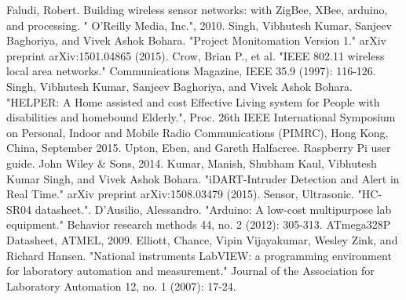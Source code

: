 \documentclass[letterpaper, 10 pt, conference]{ieeeconf}
\begin{document}
\begin{thebibliography}{99}

 Faludi, Robert. Building wireless sensor networks: with ZigBee, XBee, arduino, and processing. " O'Reilly Media, Inc.", 2010.
 Singh, Vibhutesh Kumar, Sanjeev Baghoriya, and Vivek Ashok Bohara. "Project Monitomation Version 1." arXiv preprint arXiv:1501.04865 (2015).
 Crow, Brian P., et al. "IEEE 802.11 wireless local area networks." Communications Magazine, IEEE 35.9 (1997): 116-126.
 Singh, Vibhutesh Kumar, Sanjeev Baghoriya, and Vivek Ashok Bohara. "HELPER: A Home assisted and cost Effective Living system for People with disabilities and homebound Elderly.", Proc. 26th IEEE International Symposium on Personal, Indoor and Mobile Radio Communications (PIMRC), Hong Kong, China, September 2015.
 Upton, Eben, and Gareth Halfacree. Raspberry Pi user guide. John Wiley \& Sons, 2014.
 Kumar, Manish, Shubham Kaul, Vibhutesh Kumar Singh, and Vivek Ashok Bohara. "iDART-Intruder Detection and Alert in Real Time." arXiv preprint arXiv:1508.03479 (2015).
 Sensor, Ultrasonic. "HC-SR04 datasheet.".
 D’Ausilio, Alessandro. "Arduino: A low-cost multipurpose lab equipment." Behavior research methods 44, no. 2 (2012): 305-313.
 ATmega328P Datasheet, ATMEL, 2009.
 Elliott, Chance, Vipin Vijayakumar, Wesley Zink, and Richard Hansen. "National instruments LabVIEW: a programming environment for laboratory automation and measurement." Journal of the Association for Laboratory Automation 12, no. 1 (2007): 17-24.

\end{thebibliography}
\end{document}

